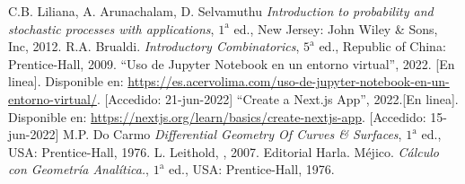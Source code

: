 \begin{thebibliography}{99}
	 C.B. Liliana, A. Arunachalam, D. Selvamuthu
	{\it Introduction to probability and stochastic processes with applications}, $1^{\text{a}}$ ed., New Jersey: John Wiley \& Sons, Inc, 2012.
	 R.A. Brualdi.
	{\it Introductory Combinatorics}, $5^{\text{a}}$ ed., Republic of China: Prentice-Hall, 2009.
	 ``Uso de Jupyter Notebook en un entorno virtual'', 2022. [En linea]. Disponible en: \url{https://es.acervolima.com/uso-de-jupyter-notebook-en-un-entorno-virtual/}. [Accedido: 21-jun-2022]
	 ``Create a Next.js App'', 2022.[En linea]. Disponible en: \url{https://nextjs.org/learn/basics/create-nextjs-app}. [Accedido: 15-jun-2022]
	 M.P. Do Carmo
	{\it Differential Geometry Of Curves \& Surfaces}, $1^{\text{a}}$ ed., USA: Prentice-Hall, 1976.
	 L. Leithold, , 2007.  Editorial Harla. M\'ejico. 
	{\it C\'alculo con Geometr\'ia Anal\'itica.}, $1^{\text{a}}$ ed., USA: Prentice-Hall, 1976.
\end{thebibliography} 